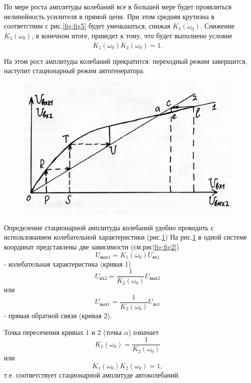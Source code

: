 По мере роста амплитуды колебаний все в большей мере будет проявляться нелинейность усилителя в прямой цепи. При этом средняя крутизна в соответствии с рис.\ref{fig:fig5} будет уменьшаться, снижая $K_1(\omega_0)$. Снижение $K_1(\omega_0)$, в конечном итоге, приведет к тому, что будет выполнено условие
\begin{equation*}
\dot{K}_1(\omega_0)\dot{K}_2(\omega_0)=1.
\end{equation*}

На этом рост амплитуды колебаний прекратится: переходный режим завершится, наступит стационарный режим автогенератора.

\begin{figure}[h]
	\centering
	\includegraphics[width=0.6\linewidth]{circuit/fig8}
	\caption{}
	\label{fig:fig8}
\end{figure}

Определение стационарной амплитуды колебаний удобно проводить с использованием колебательной характеристики (рис.\ref{fig:fig8})
На рис.\ref{fig:fig8} в одной системе координат представлены две зависимости (см.рис\ref{fig:fig2}) 
\begin{equation*}
U_{\text{вых}1}=K_1(\omega_0)U_{\text{вх}1}
\end{equation*}
- колебательная характеристика (кривая 1)
\begin{equation*}
U_{\text{вх}2}=\frac{1}{K_2(\omega_0)}U_{\text{вых}2}
\end{equation*}
или
\begin{equation*}
U_{\text{вых}1}=\frac{1}{K_2(\omega_0)}U_{\text{вх}1}
\end{equation*}
- прямая обратной связи (кривая 2).

Точка пересечения кривых 1 и 2 (точка $\alpha$) означает
\begin{equation*}
K_1(\omega_0)=\frac{1}{K_2(\omega_0)}
\end{equation*}
или
\begin{equation}
K_1(\omega_0)K_2(\omega_0)=1,
\label{eq:7}
\end{equation}
т.е. соответствует стационарной амплитуде автоколебаний.


